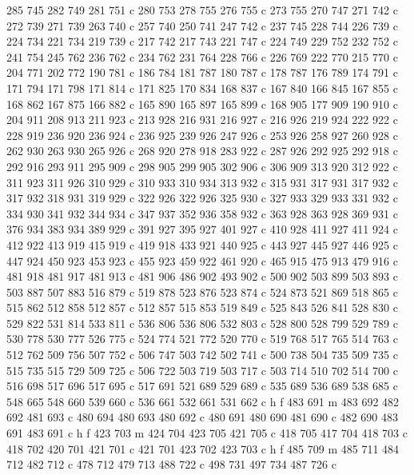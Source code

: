 {{   285 745 282 749 281 751 c
   280 753 278 755 276 755 c
   273 755 270 747 271 742 c
   272 739 271 739 263 740 c
   257 740 250 741 247 742 c
   237 745 228 744 226 739 c
   224 734 221 734 219 739 c
   217 742 217 743 221 747 c
   224 749 229 752 232 752 c
   241 754 245 762 236 762 c
   234 762 231 764 228 766 c
   226 769 222 770 215 770 c
   204 771 202 772 190 781 c
   186 784 181 787 180 787 c
   178 787 176 789 174 791 c
   171 794 171 798 171 814 c
   171 825 170 834 168 837 c
   167 840 166 845 167 855 c
   168 862 167 875 166 882 c
   165 890 165 897 165 899 c
   168 905 177 909 190 910 c
   204 911 208 913 211 923 c
   213 928 216 931 216 927 c
   216 926 219 924 222 922 c
   228 919 236 920 236 924 c
   236 925 239 926 247 926 c
   253 926 258 927 260 928 c
   262 930 263 930 265 926 c
   268 920 278 918 283 922 c
   287 926 292 925 292 918 c
   292 916 293 911 295 909 c
   298 905 299 905 302 906 c
   306 909 313 920 312 922 c
   311 923 311 926 310 929 c
   310 933 310 934 313 932 c
   315 931 317 931 317 932 c
   317 932 318 931 319 929 c
   322 926 322 926 325 930 c
   327 933 329 933 331 932 c
   334 930 341 932 344 934 c
   347 937 352 936 358 932 c
   363 928 363 928 369 931 c
   376 934 383 934 389 929 c
   391 927 395 927 401 927 c
   410 928 411 927 411 924 c
   412 922 413 919 415 919 c
   419 918 433 921 440 925 c
   443 927 445 927 446 925 c
   447 924 450 923 453 923 c
   455 923 459 922 461 920 c
   465 915 475 913 479 916 c
   481 918 481 917 481 913 c
   481 906 486 902 493 902 c
   500 902 503 899 503 893 c
   503 887 507 883 516 879 c
   519 878 523 876 523 874 c
   524 873 521 869 518 865 c
   515 862 512 858 512 857 c
   512 857 515 853 519 849 c
   525 843 526 841 528 830 c
   529 822 531 814 533 811 c
   536 806 536 806 532 803 c
   528 800 528 799 529 789 c
   530 778 530 777 526 775 c
   524 774 521 772 520 770 c
   519 768 517 765 514 763 c
   512 762 509 756 507 752 c
   506 747 503 742 502 741 c
   500 738 504 735 509 735 c
   515 735 515 729 509 725 c
   506 722 503 719 503 717 c
   503 714 510 702 514 700 c
   516 698 517 696 517 695 c
   517 691 521 689 529 689 c
   535 689 536 689 538 685 c
   548 665 548 660 539 660 c
   536 661 532 661 531 662 c
   h f
   483 691 m
   483 692 482 692 481 693 c
   480 694 480 693 480 692 c
   480 691 480 690 481 690 c
   482 690 483 691 483 691 c
   h f
   423 703 m
   424 704 423 705 421 705 c
   418 705 417 704 418 703 c
   418 702 420 701 421 701 c
   421 701 423 702 423 703 c
   h f
   485 709 m
   485 711 484 712 482 712 c
   478 712 479 713 488 722 c
   498 731 497 734 487 726 c
}}
